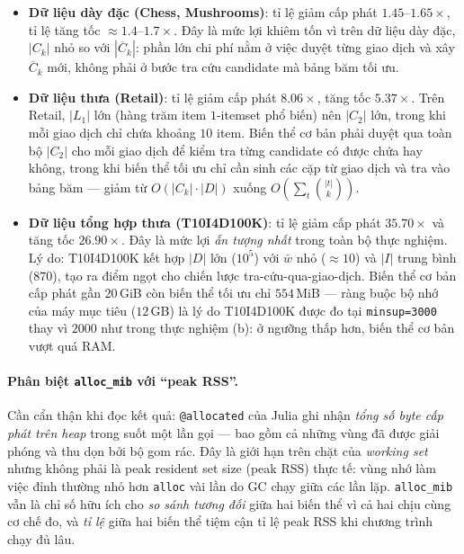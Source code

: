 \begin{itemize}
    \item \textbf{Dữ liệu dày đặc (Chess, Mushrooms)}: tỉ lệ giảm cấp phát $1.45$--$1.65\times$, tỉ lệ tăng tốc $\approx 1.4$--$1.7\times$. Đây là mức lợi khiêm tốn vì trên dữ liệu dày đặc, $|C_k|$ nhỏ so với $|\overline{C}_k|$: phần lớn chi phí nằm ở việc duyệt từng giao dịch và xây $\overline{C}_k$ mới, không phải ở bước tra cứu candidate mà bảng băm tối ưu.
    \item \textbf{Dữ liệu thưa (Retail)}: tỉ lệ giảm cấp phát $8.06\times$, tăng tốc $5.37\times$. Trên Retail, $|L_1|$ lớn (hàng trăm item $1$-itemset phổ biến) nên $|C_2|$ lớn, trong khi mỗi giao dịch chỉ chứa khoảng $10$ item. Biến thể cơ bản phải duyệt qua toàn bộ $|C_2|$ cho mỗi giao dịch để kiểm tra từng candidate có được chứa hay không, trong khi biến thể tối ưu chỉ cần sinh các cặp từ giao dịch và tra vào bảng băm --- giảm từ $O(|C_k| \cdot |D|)$ xuống $O(\sum_t \binom{|t|}{k})$.
    \item \textbf{Dữ liệu tổng hợp thưa (T10I4D100K)}: tỉ lệ giảm cấp phát $35.70\times$ và tăng tốc $26.90\times$. Đây là mức lợi \emph{ấn tượng nhất} trong toàn bộ thực nghiệm. Lý do: T10I4D100K kết hợp $|D|$ lớn ($10^5$) với $\bar{w}$ nhỏ ($\approx 10$) và $|I|$ trung bình ($870$), tạo ra điểm ngọt cho chiến lược tra-cứu-qua-giao-dịch. Biến thể cơ bản cấp phát gần $20$\,GiB còn biến thể tối ưu chỉ $554$\,MiB --- ràng buộc bộ nhớ của máy mục tiêu ($12$\,GB) là lý do T10I4D100K được đo tại \texttt{minsup=3000} thay vì $2000$ như trong thực nghiệm (b): ở ngưỡng thấp hơn, biến thể cơ bản vượt quá RAM.
\end{itemize}

\paragraph{Phân biệt \texttt{alloc\_mib} với ``peak RSS''.} Cần cẩn thận khi đọc kết quả: \texttt{@allocated} của Julia ghi nhận \emph{tổng số byte cấp phát trên heap} trong suốt một lần gọi --- bao gồm cả những vùng đã được giải phóng và thu dọn bởi bộ gom rác. Đây là giới hạn trên chặt của \emph{working set} nhưng không phải là peak resident set size (peak RSS) thực tế: vùng nhớ làm việc đỉnh thường nhỏ hơn \texttt{alloc} vài lần do GC chạy giữa các lần lặp. \texttt{alloc\_mib} vẫn là chỉ số hữu ích cho \emph{so sánh tương đối} giữa hai biến thể vì cả hai chịu cùng cơ chế đo, và \emph{tỉ lệ} giữa hai biến thể tiệm cận tỉ lệ peak RSS khi chương trình chạy đủ lâu.

